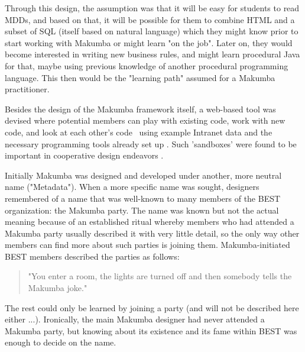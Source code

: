\documentclass{sig-alt-release2}
\begin{document}
Through this design, the assumption was that it will be easy for students to read MDDs, and based on that, it will be possible for them to combine HTML and a subset of SQL (itself based on natural language) which they might know prior to start working with Makumba or might learn "on the job". Later on, they would become interested in writing new business rules, and might learn procedural Java for that, maybe using previous knowledge of another procedural programming language. This then would be the "learning path" assumed for a Makumba practitioner.

Besides the design of the Makumba framework itself, a web-based tool was devised where potential members can play with existing code, work with new code, and look at each other's code \, using example Intranet data and the necessary programming tools already set up \cite{bogdan08} . Such 'sandboxes' were found to be important in cooperative design endeavors \cite{trigg00}.


Initially Makumba was designed and developed under another, more neutral name ("Metadata"). When a more specific name was sought, designers remembered of a name that was well-known to many members of the BEST organization: the Makumba party. The name was known but not the actual meaning because of an established ritual whereby members who had attended a Makumba party usually described it with very little detail,  so the only way other members can find more about such parties is joining them.	 Makumba-initiated BEST members described the parties as follows:
\begin{quotation}
	"You enter a room, the lights are turned off and then somebody tells the Makumba joke."
\end{quotation}

The rest could only be learned by joining a party (and will not be described here either ...). Ironically, the main Makumba designer had never attended a Makumba party, but knowing about its existence and its fame within BEST was enough to decide on the name.
\end{document}
